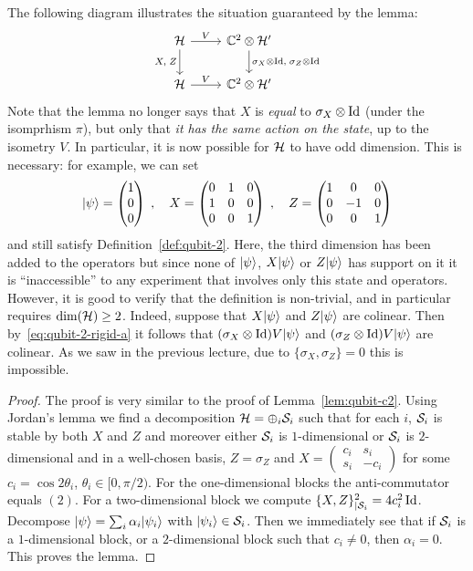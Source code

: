 The following diagram illustrates the situation guaranteed by the lemma:
\begin{equation}\label{diag:one-qubit}
\begin{tikzcd}
\mH \arrow{r}{V} \arrow[swap]{d}{X,\; Z} & \C^2 \otimes \mH' \arrow{d}{\sigma_X\otimes \Id,\; \sigma_Z\otimes \Id} \\
\mH \arrow{r}{V} & \C^2 \otimes \mH'
\end{tikzcd}
\end{equation}
Note that the lemma no longer says that $X$ is \emph{equal} to $\sigma_X \otimes \mathop{\rm Id}\nolimits$ (under the isomprhism $\pi$), but only that \emph{it has the same action on the state}, up to the isometry $V$. In particular, it is now possible for $\mathcal{H}$ to have odd dimension. This is necessary: for example, we can set
\[ |\psi\rangle = \begin{pmatrix} 1 \\ 0 \\ 0 \end{pmatrix}\;,\quad X = \begin{pmatrix} 0 & 1 & 0 \\ 1 & 0 & 0 \\ 0 & 0 & 1 \end{pmatrix}\;,\quad Z =  \begin{pmatrix} 1 & 0 & 0 \\ 0 & -1 & 0 \\ 0 & 0 & 1 \end{pmatrix}\]
and still satisfy Definition~\ref{def:qubit-2}.  Here, the third dimension has been added to the operators but since none of $|\psi\rangle$, $X|\psi\rangle$ or $Z|\psi\rangle$ has support on it it is ``inaccessible'' to any experiment that involves only this state and operators. However, it is good to verify that the definition is non-trivial, and in particular requires $\dim(\mathcal{H})\geq 2$. Indeed, suppose that $X|\psi\rangle$ and $Z|\psi\rangle$ are colinear. Then by~\eqref{eq:qubit-2-rigid-a} it follows that $(\sigma_X\otimes \mathop{\rm Id}\nolimits)V|\psi\rangle$ and $(\sigma_Z\otimes \mathop{\rm Id}\nolimits)V|\psi\rangle$ are colinear. As we saw in the previous lecture, due to $\{\sigma_X,\sigma_Z\}=0$ this is impossible. 

\begin{proof}
The proof is very similar to the proof of Lemma~\ref{lem:qubit-c2}. Using Jordan's lemma we find a decomposition $\mathcal{H} = \oplus_i \mathcal{S}_i$ such that for each $i$, $\mathcal{S}_i$ is stable by both $X$ and $Z$ and moreover either $\mathcal{S}_i$ is $1$-dimensional or $\mathcal{S}_i$ is $2$-dimensional and in a well-chosen basis, $Z = \sigma_Z$ and $X = \begin{pmatrix} c_i & s_i \\ s_i & -c_i \end{pmatrix}$ for some $c_i = \cos 2\theta_i$, $\theta_i \in [0,\pi/2)$. For the one-dimensional blocks the anti-commutator equals $(2)$. For a two-dimensional block we compute $\{X,Z\}^2_{|\mathcal{S}_i} = 4 c_i^2 \mathop{\rm Id}\nolimits$. Decompose $|\psi\rangle = \sum_i \alpha_i |\psi_i\rangle$ with $|\psi_i\rangle \in \mathcal{S}_i$. Then we immediately see that if $\mathcal{S}_i$ is a $1$-dimensional block, or a $2$-dimensional block such that $c_i \neq 0$, then $\alpha_i = 0$. This proves the lemma. 
\end{proof}

